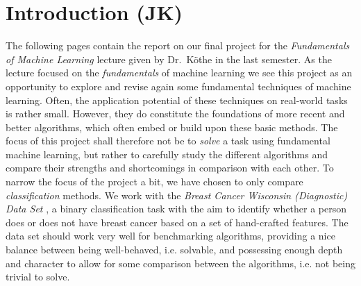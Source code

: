 \documentclass[12pt, a4paper]{scrartcl}
\begin{document}
\tableofcontents
\pagebreak




\section{Introduction (JK)}
The following pages contain the report on our final project for the \emph{Fundamentals of Machine Learning} lecture given by Dr.\ Köthe in the last semester. As the lecture focused on the \emph{fundamentals} of machine learning we see this project as an opportunity to explore and revise again some fundamental techniques of machine learning. Often, the application potential of these techniques on real-world tasks is rather small. However, they do constitute the foundations of more recent and better algorithms, which often embed or build upon these basic methods. 
The focus of this project shall therefore not be to \emph{solve} a task using fundamental machine learning, but rather to carefully study the different algorithms and compare their strengths and shortcomings in comparison with each other. To narrow the focus of the project a bit, we have chosen to only compare \emph{classification} methods.
We work with the \emph{Breast Cancer Wisconsin (Diagnostic) Data Set} \cite{street1993nuclear}, a binary classification task with the aim to identify whether a person does or does not have breast cancer based on a set of hand-crafted features. The data set should work very well for benchmarking algorithms, providing a nice balance between being well-behaved, i.e. solvable, and possessing enough depth and character to allow for some comparison between the algorithms, i.e. not being trivial to solve.
\end{document}
